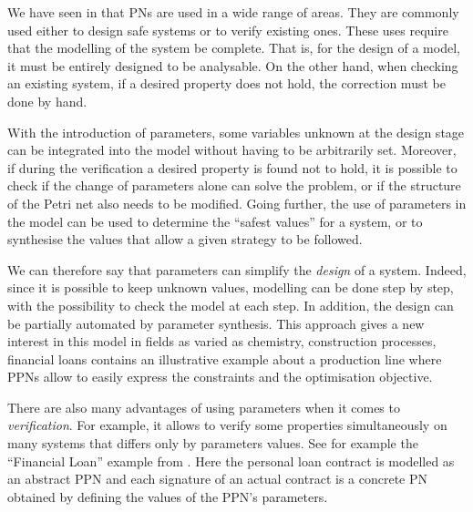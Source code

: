 We have seen in  that \acp{PN} are used in a wide range of areas.
They are commonly used either to design safe systems or to verify existing ones.
These uses require that the modelling of the system be complete.
That is, for the design of a model, it must be entirely designed to be analysable.
On the other hand, when checking an existing system, if a desired property does not hold, the correction must be done by hand.

With the introduction of parameters, some variables unknown at the design stage can be integrated into the model without having to be arbitrarily set.
Moreover, if during the verification a desired property is found not to hold, it is possible to check if the change of parameters alone can solve the problem, or if the structure of the Petri net also needs to be modified.
Going further, the use of parameters in the model can be used to determine the ``safest values'' for a system, or to synthesise the values that allow a given strategy to be followed.

We can therefore say that parameters can simplify the \emph{design} of a system. Indeed, since it is possible to keep unknown values, modelling can be done step by step, with the possibility to check the model at each step.
In addition, the design can be partially automated by parameter synthesis.
This approach gives a new interest in this model in fields as varied as chemistry, construction processes, financial loans\etc
\cite{David17} contains an illustrative example about a production line where \acp{PPN} allow to easily express the constraints and the optimisation objective.

There are also many advantages of using parameters when it comes to \emph{verification}.
For example, it allows to verify some properties simultaneously on many systems that differs only by parameters values.
See for example the ``Financial Loan'' example from \cite{David17}.
Here the personal loan contract is modelled as an abstract \ac{PPN} and each signature of an actual contract is a concrete \ac{PN} obtained by defining the values of the \ac{PPN}'s parameters.
